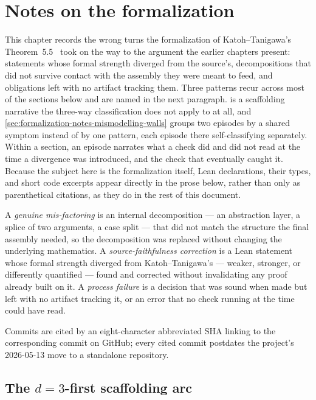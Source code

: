 \section{Notes on the formalization}
\label{sec:formalization-notes}

This chapter records the wrong turns the formalization of
Katoh--Tanigawa's Theorem~5.5~\cite{katohTanigawa2011} took on the way
to the argument the earlier chapters present: statements whose formal
strength diverged from the source's, decompositions that did not
survive contact with the assembly they were meant to feed, and
obligations left with no artifact tracking them. Three patterns recur
across most of the sections below and are named in the next paragraph.
 is a scaffolding
narrative the three-way classification does not apply to at all, and
\cref{sec:formalization-notes-mismodelling-walls} groups two episodes
by a shared symptom instead of by one pattern, each episode there
self-classifying separately. Within a section, an episode narrates
what a check did and did not read at the time a divergence was
introduced, and the check that eventually caught it. Because the
subject here is the formalization itself, Lean declarations, their
types, and short code excerpts appear directly in the prose below,
rather than only as parenthetical citations, as they do in the rest of
this document.

A \emph{genuine mis-factoring} is an internal decomposition --- an
abstraction layer, a splice of two arguments, a case split --- that did
not match the structure the final assembly needed, so the decomposition
was replaced without changing the underlying mathematics. A
\emph{source-faithfulness correction} is a Lean statement whose formal
strength diverged from Katoh--Tanigawa's --- weaker, stronger, or
differently quantified --- found and corrected without invalidating any
proof already built on it. A \emph{process failure} is a decision that
was sound when made but left with no artifact tracking it, or an error
that no check running at the time could have read.

Commits are cited by an eight-character abbreviated SHA linking to the
corresponding commit on GitHub; every cited commit postdates the
project's 2026-05-13 move to a standalone repository.

\subsection{The \texorpdfstring{$d = 3$}{d = 3}-first scaffolding arc}
\label{sec:formalization-notes-scaffolding-arc}

